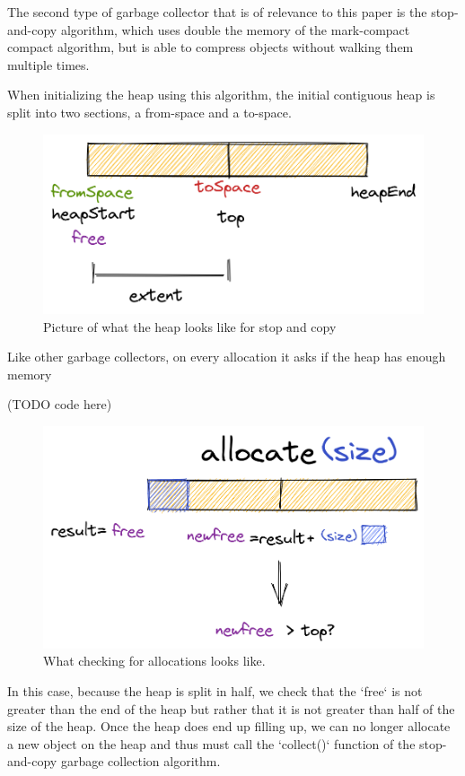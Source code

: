 \documentclass[index]{subfiles}
\begin{document}
The second type of garbage collector that is of relevance to this paper is the stop-and-copy algorithm, which uses double the memory of the mark-compact compact algorithm, but is able to compress objects without walking them multiple times.

When initializing the heap using this algorithm,  the initial contiguous heap is split into two sections, a from-space and a to-space.

\begin{figure}[H]
    \centering
    \includegraphics[scale=0.3]{pics/split-heap-diagram.png}
    \caption{Picture of what the heap looks like for stop and copy}
\end{figure}

Like other garbage collectors, on every allocation it asks if the heap has enough memory

(TODO code here)

\begin{figure}[H]
    \centering
    \includegraphics[scale=0.3]{pics/allocation.png}
    \caption{What checking for allocations looks like.}
\end{figure}

In this case, because the heap is split in half, we check that the `free` is not greater than the end of the heap but rather that it is not greater than half of the size of the heap. Once the heap does end up filling up, we can no longer allocate a new object on the heap and thus must call the `collect()` function of the stop-and-copy garbage collection algorithm.
\end{document}
